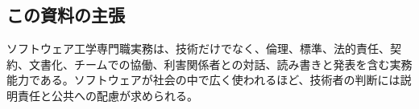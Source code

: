 \subsection*{この資料の主張}

ソフトウェア工学専門職実務は、技術だけでなく、倫理、標準、法的責任、契約、文書化、チームでの協働、利害関係者との対話、読み書きと発表を含む実務能力である。ソフトウェアが社会の中で広く使われるほど、技術者の判断には説明責任と公共への配慮が求められる。
